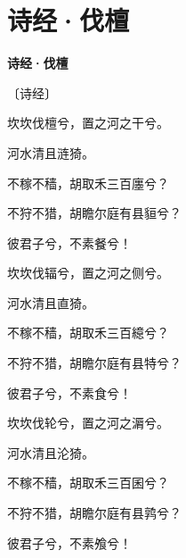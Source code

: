 \documentclass[12pt,UTF-8,openany,fontset=none]{ctexbook}
\begin{document}
\section{诗经·伐檀}


\begin{center}
    {\bfseries 诗经·伐檀}

    \vspace{18pt}

    \begin{large}\xuwen
        〔诗经〕
    \end{large}

\end{center}

    \vspace{18pt}  %

\begin{center}
    \begin{Large}

        坎坎伐檀兮，置之河之干兮。

        河水清且涟猗。

        不稼不穑，胡取禾三百廛兮？

        不狩不猎，胡瞻尔庭有县貆兮？

        彼君子兮，不素餐兮！

        \vspace{18pt}  %

        坎坎伐辐兮，置之河之侧兮。

        河水清且直猗。

        不稼不穑，胡取禾三百繶兮？

        不狩不猎，胡瞻尔庭有县特兮？

        彼君子兮，不素食兮！

        \vspace{18pt}  %

        坎坎伐轮兮，置之河之漘兮。

        河水清且沦猗。

        不稼不穑，胡取禾三百囷兮？

        不狩不猎，胡瞻尔庭有县鹑兮？

        彼君子兮，不素飧兮！

    \end{Large}

\end{center}

\vspace{8pt}
\clearpage
\end{document}
